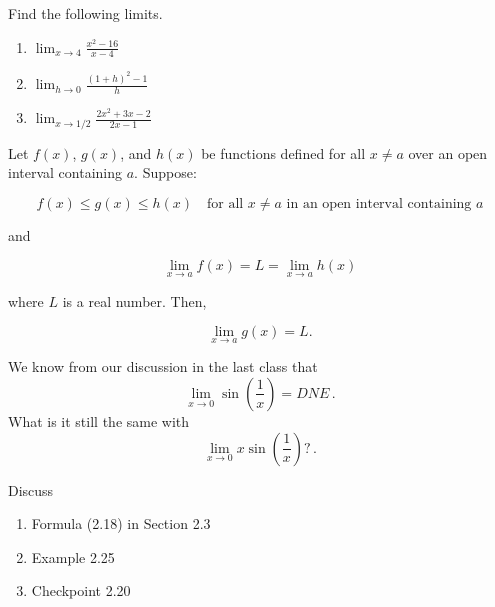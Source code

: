 \documentclass[12pt]{amsart}
\begin{document}
\begin{question}
	Find the following limits.
	\begin{enumerate}
		\item $\displaystyle\lim_{x \to 4}  \frac{ x^2 - 16}{x - 4}$
		\item $\displaystyle\lim_{h \to 0}  \frac{ (1 + h)^2 - 1}{h}$
		\item $\displaystyle\lim_{x \to 1/2}  \frac{ 2x^2 + 3x - 2}{2x -1}$
	\end{enumerate}
\end{question}

\begin{theorem}
	Let \( f(x) \), \( g(x) \), and \( h(x) \) be functions defined for all \( x \neq a \) over an open interval containing \( a \). Suppose:

	\[
		f(x) \leq g(x) \leq h(x) \quad \text{for all } x \neq a \text{ in an open interval containing } a
	\]

	and

	\[
		\lim_{x \to a} f(x) = L = \lim_{x \to a} h(x)
	\]

	where \( L \) is a real number. Then,

	\[
		\lim_{x \to a} g(x) = L.
	\]
\end{theorem}

\begin{question}
	We know from our discussion in the last class that
	\begin{equation*}
		\lim_{x \to 0} \sin \left( \frac{1}{x} \right) = DNE \,.
	\end{equation*}
	What is it still the same with
	\begin{equation*}
		\lim_{x \to 0} x \sin \left( \frac{1}{x} \right) ?\,.
	\end{equation*}
\end{question}

\begin{question}
	Discuss
	\begin{enumerate}
		\item Formula (2.18) in Section 2.3
		\item Example 2.25
		\item Checkpoint 2.20
	\end{enumerate}

\end{question}


\printbibliography
%
%
\end{document}
